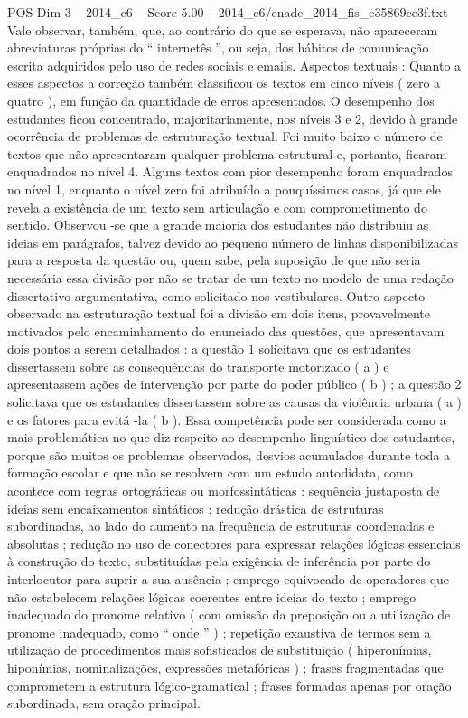 \begin{textsample}{POS Dim 3 – 2014\_c6 – Score 5.00 – 2014\_c6/enade\_2014\_fis\_e35869ce3f.txt}
Vale observar, também, que, ao contrário do que se esperava, não apareceram abreviaturas próprias do “ internetês ”, ou seja, dos hábitos de comunicação escrita adquiridos pelo uso de redes sociais e emails.
Aspectos textuais : Quanto a esses aspectos a correção também classificou os textos em cinco níveis ( zero a quatro ), em função da quantidade de erros apresentados.
O desempenho dos estudantes ficou concentrado, majoritariamente, nos níveis 3 e 2, devido à grande ocorrência de problemas de estruturação textual.
Foi muito baixo o número de textos que não apresentaram qualquer problema estrutural e, portanto, ficaram enquadrados no nível 4.
Alguns textos com pior desempenho foram enquadrados no nível 1, enquanto o nível zero foi atribuído a pouquíssimos casos, já que ele revela a existência de um texto sem articulação e com comprometimento do sentido.
Observou -se que a grande maioria dos estudantes não distribuiu as ideias em parágrafos, talvez devido ao pequeno número de linhas disponibilizadas para a resposta da questão ou, quem sabe, pela suposição de que não seria necessária essa divisão por não se tratar de um texto no modelo de uma redação dissertativo-argumentativa, como solicitado nos vestibulares.
Outro aspecto observado na estruturação textual foi a divisão em dois itens, provavelmente motivados pelo encaminhamento do enunciado das questões, que apresentavam dois pontos a serem detalhados : a questão 1 solicitava que os estudantes dissertassem sobre as consequências do transporte motorizado ( a ) e apresentassem ações de intervenção por parte do poder público ( b ) ; a questão 2 solicitava que os estudantes dissertassem sobre as causas da violência urbana ( a ) e os fatores para evitá -la ( b ).
Essa competência pode ser considerada como a mais problemática no que diz respeito ao desempenho linguístico dos estudantes, porque são muitos os problemas observados, desvios acumulados durante toda a formação escolar e que não se resolvem com um estudo autodidata, como acontece com regras ortográficas ou morfossintáticas : sequência justaposta de ideias sem encaixamentos sintáticos ; redução drástica de estruturas subordinadas, ao lado do aumento na frequência de estruturas coordenadas e absolutas ; redução no uso de conectores para expressar relações lógicas essenciais à construção do texto, substituídas pela exigência de inferência por parte do interlocutor para suprir a sua ausência ; emprego equivocado de operadores que não estabelecem relações lógicas coerentes entre ideias do texto ; emprego inadequado do pronome relativo ( com omissão da preposição ou a utilização de pronome inadequado, como “ onde ” ) ; repetição exaustiva de termos sem a utilização de procedimentos mais sofisticados de substituição ( hiperonímias, hiponímias, nominalizações, expressões metafóricas ) ; frases fragmentadas que comprometem a estrutura lógico-gramatical ; frases formadas apenas por oração subordinada, sem oração principal.

\end{textsample}
